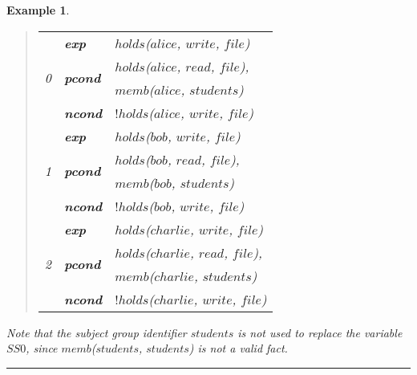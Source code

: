 \documentclass[10pt, twocolumn]{article}
\newtheorem{examp}{Example}
\newenvironment{example}{\begin{examp}\rm}{\rule{2mm}{2mm}\end{examp}}
\begin{document}
\begin{example}
          \begin{quote}
            \begin{tabular}[t]{|l|l|l|}
              \hline
              \multirow{4}{*}{0} &
              \textbf{exp} &
              $holds$($alice$, $write$, $file$) \\
              \cline{2-3}
              & 
              \multirow{2}{*}{\textbf{pcond}} &
              $holds$($alice$, $read$, $file$), \\
              &
              &
              $memb$($alice$, $students$) \\
              \cline{2-3}
              & \textbf{ncond} & $!holds$($alice$, $write$, $file$) \\
              \hline
              \hline
              \multirow{4}{*}{1} &
              \textbf{exp} &
              $holds$($bob$, $write$, $file$) \\
              \cline{2-3}
              & 
              \multirow{2}{*}{\textbf{pcond}} &
              $holds$($bob$, $read$, $file$), \\
              &
              &
              $memb$($bob$, $students$) \\
              \cline{2-3}
              & \textbf{ncond} & $!holds$($bob$, $write$, $file$) \\
              \hline
              \hline
              \multirow{4}{*}{2} &
              \textbf{exp} &
              $holds$($charlie$, $write$, $file$) \\
              \cline{2-3}
              & 
              \multirow{2}{*}{\textbf{pcond}} &
              $holds$($charlie$, $read$, $file$), \\
              &
              &
              $memb$($charlie$, $students$) \\
              \cline{2-3}
              & \textbf{ncond} & $!holds$($charlie$, $write$, $file$) \\
              \hline
            \end{tabular}
          \end{quote}

          Note that the subject group identifier $students$ is not used to
          replace the variable $SS0$, since $memb$($students$, $students$) is
          not a valid fact.

        \end{example}
\end{document}
